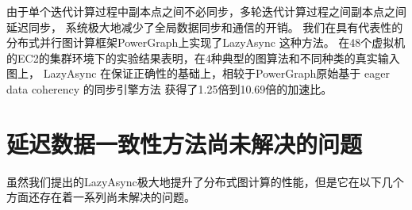 由于单个迭代计算过程中副本点之间不必同步，多轮迭代计算过程之间副本点之间延迟同步，
系统极大地减少了全局数据同步和通信的开销。
我们在具有代表性的分布式并行图计算框架PowerGraph\cite{Gonzalez@OSDI12}上实现了LazyAsync 这种方法。
在48个虚拟机的EC2的集群环境下的实验结果表明，在4种典型的图算法和不同种类的真实输入图上，
LazyAsync 在保证正确性的基础上，相较于PowerGraph原始基于 eager data coherency 的同步引擎方法
获得了1.25倍到10.69倍的加速比。


\section{延迟数据一致性方法尚未解决的问题}
虽然我们提出的LazyAsync极大地提升了分布式图计算的性能，但是它在以下几个方面还存在着一系列尚未解决的问题。    
